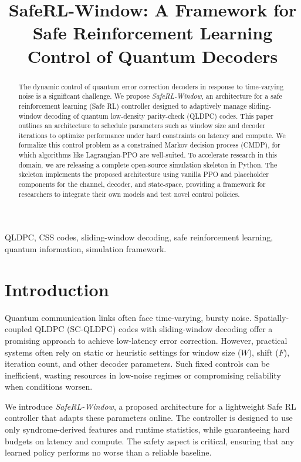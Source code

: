 \documentclass[conference]{IEEEtran}
\title{SafeRL-Window: A Framework for Safe Reinforcement Learning Control of Quantum Decoders}
\author{
\IEEEauthorblockN{Agentic Research Group}
\IEEEauthorblockA{
Email: agent@research.com}
}
\begin{document}
\maketitle

\begin{abstract}
The dynamic control of quantum error correction decoders in response to time-varying noise is a significant challenge. We propose \emph{SafeRL-Window}, an architecture for a safe reinforcement learning (Safe RL) controller designed to adaptively manage sliding-window decoding of quantum low-density parity-check (QLDPC) codes. This paper outlines an architecture to schedule parameters such as window size and decoder iterations to optimize performance under hard constraints on latency and compute. We formalize this control problem as a constrained Markov decision process (CMDP), for which algorithms like Lagrangian-PPO are well-suited. To accelerate research in this domain, we are releasing a complete open-source simulation skeleton in Python. The skeleton implements the proposed architecture using vanilla PPO and placeholder components for the channel, decoder, and state-space, providing a framework for researchers to integrate their own models and test novel control policies.
\end{abstract}

\begin{IEEEkeywords}
QLDPC, CSS codes, sliding-window decoding, safe reinforcement learning, quantum information, simulation framework.
\end{IEEEkeywords}

\section{Introduction}
Quantum communication links often face time-varying, bursty noise. Spatially-coupled QLDPC (SC-QLDPC) codes with sliding-window decoding offer a promising approach to achieve low-latency error correction. However, practical systems often rely on static or heuristic settings for window size ($W$), shift ($F$), iteration count, and other decoder parameters. Such fixed controls can be inefficient, wasting resources in low-noise regimes or compromising reliability when conditions worsen.

We introduce \emph{SafeRL-Window}, a proposed architecture for a lightweight Safe RL controller that adapts these parameters online. The controller is designed to use only syndrome-derived features and runtime statistics, while guaranteeing hard budgets on latency and compute. The safety aspect is critical, ensuring that any learned policy performs no worse than a reliable baseline.
\end{document}
